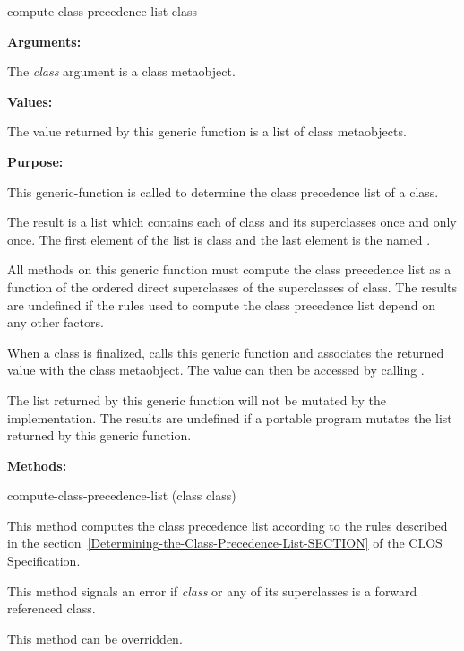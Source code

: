 \begin{defun}
compute-class-precedence-list class

\textbf{Arguments:}

The \emph{class} argument is a class metaobject.

\textbf{Values:}

The value returned by this generic function is a list of class metaobjects.

\textbf{Purpose:}

This generic-function is called to determine the class precedence list of a
class.

The result is a list which contains each of class and its superclasses once and
only once. The first element of the list is class and the last element is the
 named .

All methods on this generic function must compute the class precedence list as a
function of the ordered direct superclasses of the superclasses of class. The
results are undefined if the rules used to compute the class precedence list
depend on any other factors.

When a class is finalized,  calls this generic function and
associates the returned value with the class metaobject. The value can then be
accessed by calling .

The list returned by this generic function will not be mutated by the
implementation. The results are undefined if a portable program mutates the list
returned by this generic function.

\textbf{Methods:}

\begin{defun}
compute-class-precedence-list (class class)

This method computes the class precedence list according to the rules described
in the section~\ref{Determining-the-Class-Precedence-List-SECTION} of the CLOS
Specification.

This method signals an error if \emph{class} or any of its superclasses is a
forward referenced class.

This method can be overridden.
\end{defun}
\end{defun}

